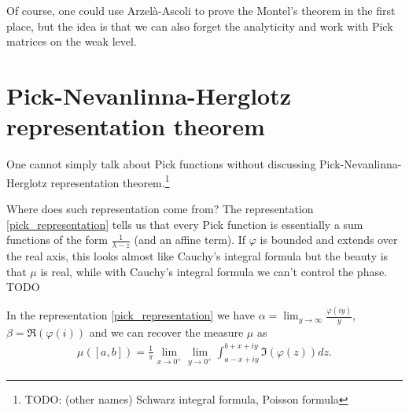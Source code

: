 Of course, one could use Arzel\`{a}-Ascoli to prove the Montel's theorem in the first place, but the idea is that we can also forget the analyticity and work with Pick matrices on the weak level.

\section{Pick-Nevanlinna-Herglotz representation theorem}

One cannot simply talk about Pick functions without discussing Pick-Nevanlinna-Herglotz representation theorem.\footnote{TODO: (other names) Schwarz integral formula, Poisson formula}

Where does such representation come from? The representation \ref{pick_representation} tells us that every Pick function is essentially a sum functions of the form $\frac{1}{\lambda - z}$ (and an affine term). If $\varphi$ is bounded and extends over the real axis, this looks almost like Cauchy's integral formula but the beauty is that $\mu$ is real, while with Cauchy's integral formula we can't control the phase. TODO

\begin{comment}
We have however almost discussed such identities already. We for instance observed that
\begin{align*}
	& \frac{1}{2 \pi}\int_{-\infty}^{\infty} \frac{\Im\left(\varphi(z)\right)}{(z - a) (z - \overline{a})} dz \\
	=& \Re\left(\frac{1}{2 \pi i}\int_{-\infty}^{\infty} \frac{\varphi(z)}{(z - a) (z - \overline{a})} dz\right) \\
	=& \frac{\varphi(a) - \overline{\varphi(a)}}{a - \overline{a}} \\
	=& \Im\left(\frac{\varphi(a)}{a}\right)
\end{align*}
\end{comment}

\begin{lause}
	In the representation \ref{pick_representation} we have
	$\alpha = \lim_{y \to \infty} \frac{\varphi(i y)}{y}$, $\beta = \Re(\varphi(i))$ and we can recover the measure $\mu$ as
	\begin{align}\label{measure_recovery}
		\mu([a, b]) = \frac{1}{\pi}\lim_{x \to 0^{+}} \lim_{y \to 0^{+}} \int_{a - x + i y}^{b + x + i y} \Im(\varphi(z)) d z.
	\end{align}
\end{lause}

